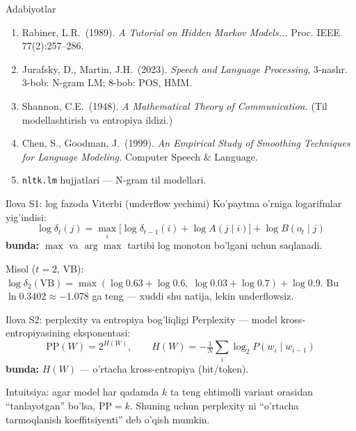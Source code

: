 \documentclass[aspectratio=169,11pt]{beamer}
\newcommand{\bunda}[1]{{\small\textbf{bunda:}\; #1}}
\begin{document}
\begin{frame}{Adabiyotlar}
  \begin{enumerate}\small\setlength\itemsep{5pt}
    \item Rabiner, L.R.\ (1989). \textit{A Tutorial on Hidden Markov Models...}
          Proc. IEEE 77(2):257--286.
    \item Jurafsky, D., Martin, J.H.\ (2023). \textit{Speech and Language
          Processing}, 3-nashr. 3-bob: N-gram LM; 8-bob: POS, HMM.
    \item Shannon, C.E.\ (1948). \textit{A Mathematical Theory of Communication.}
          (Til modellashtirish va entropiya ildizi.)
    \item Chen, S., Goodman, J.\ (1999). \textit{An Empirical Study of Smoothing
          Techniques for Language Modeling.} Computer Speech \& Language.
    \item \texttt{nltk.lm} hujjatlari --- N-gram til modellari.
  \end{enumerate}
\end{frame}

\appendix

\begin{frame}{Ilova S1: log fazoda Viterbi (underflow yechimi)}
  \small
  Ko'paytma o'rniga logarifmlar yig'indisi:
  $$ \log \delta_t(j) = \max_i\big[\log\delta_{t-1}(i) + \log A(j\mid i)\big] + \log B(o_t\mid j) $$
  \bunda{$\max$ va $\arg\max$ tartibi log monoton bo'lgani uchun saqlanadi.}
  \vspace{4pt}

  Misol ($t{=}2$, VB): $\log\delta_2(\text{VB}) =
  \max(\log 0.63 + \log 0.6,\; \log 0.03 + \log 0.7) + \log 0.9$.
  Bu $\ln 0.3402 \approx -1.078$ ga teng --- xuddi shu natija, lekin
  underflowsiz.
\end{frame}

\begin{frame}{Ilova S2: perplexity va entropiya bog'liqligi}
  \small
  Perplexity --- model kross-entropiyasining eksponentasi:
  $$ \mathrm{PP}(W) = 2^{H(W)}, \qquad H(W) = -\tfrac{1}{N}\sum_{i} \log_2 P(w_i\mid w_{i-1}) $$
  \bunda{$H(W)$ --- o'rtacha kross-entropiya (bit/token).}
  \vspace{4pt}

  Intuitsiya: agar model har qadamda $k$ ta teng ehtimolli variant orasidan
  ``tanlayotgan'' bo'lsa, $\mathrm{PP}=k$. Shuning uchun perplexity ni
  ``o'rtacha tarmoqlanish koeffitsiyenti'' deb o'qish mumkin.
\end{frame}
\end{document}
